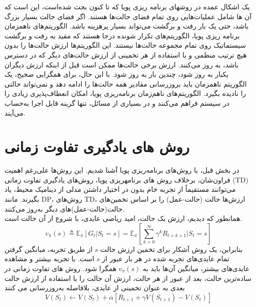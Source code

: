 %
%
%
یک اشکال عمده در روشهای برنامه ریزی پویا که تا کنون بحث شده‌است، این است که آن ها شامل عملیات‌هایی روی تمام فضای حالت‌ها هستند.
اگر فضای حالت بسیار بزرگ باشد،
حتی یک بار رفت و برگشت می‌تواند بسیار پرهزینه باشد.
الگوریتم‌های ناهمزمان برنامه ریزی پویا، الگوریتم‌های تکرار شونده درجا هستند که مقید به رفت و برگشت سیستماتیک روی تمام مجموعه حالت‌ها نیستند. این الگوریتم‌ها ارزش حالت‌ها را بدون هیچ ترتیب منظمی ‌و با استفاده از هر تخمینی از ارزش حالت‌های دیگر که در دسترس باشد، به روز می‌کنند.
 ارزش برخی حالت‌ها ممکن است قبل از اینکه ارزش دیگران یکبار به روز شود، چندین بار به روز شود. با این حال، برای همگرایی صحیح، یک الگوریتم ناهمزمان باید بروزرسانی مقادیر همه حالت‌ها را ادامه دهد و نمی‌تواند حالتی را نادیده بگیرد.
الگوریتم‌های ناهم‌زمان برنامه‌ریزی پویا، امکان انعطاف‌پذیری زیادی را در سیستم فراهم می‌کنند و در بسیاری از مسائل، تنها گزینه قابل اجرا به‌حساب می‌آیند.
\section{روش های یادگیری تفاوت زمانی}
در بخش قبل، با روش‌های برنامه‌ریزی پویا آشنا شدیم. این روش‌ها علی‌رغم اهمیت فراون‌شان،
برخلاف روش های برنامه\nf ریزی پویا، روش‌های 
{یادگیری تفاوت زمانی} (TD) می‌توانند مستقیماً از تجربه خام بدون در اختیار داشتن مدلی از دینامیک محیط، یاد بگیرند. مانند DP، روش‌های TD، ارزش‌ها حالت  (حالت-عمل) را بر اساس تخمین‌های حالت‌(حالت-عمل)‌های دیگر به‌روز می‌کنند.
\\همانطور که دیدیم، ارزش یک حالت، امید ریاضی عایدی، با شروع از آن حالت است.
$$v_\pi(s) \triangleq \mathbb{E}_\pi\left[G_t| S_t=s\right] = \mathbb{E}_\pi\left[\sum_{k=0}^{\infty} \gamma^k R_{t+k+1}|S_t =s \right]$$
بنابراین، یک روش آشکار برای تخمین ارزش حالت $s$ از طریق تجربه، میانگین گرفتن تمام عایدی‌های تجربه شده در هر بار عبور از $s$ است.
با تجربه بیشتر و مشاهده عایدی‌های بیشتر، میانگین آن‌ها باید به $v_\pi(s)$ همگرا شود.
روش های تفاوت زمانی در ساده‌ترین حالت، بعد از عبور از هر حالت، ارزش آن حالت را با استفاده از ارزش حالت بعدی به عنوان تخمینی از عایدی، بلافاصله به‌روزرسانی می کنند
$$V(S_t) \longleftarrow V(S_t) + \alpha\left[R_{t+1} + \gamma V(S_{t+1}) - V(S_t)\right]$$

